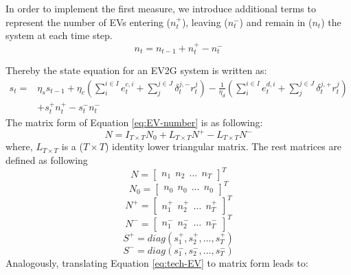 In order to implement the first measure, we introduce additional terms to represent the number of EVs entering ($n_t^+$), leaving ($n_t^-$) and remain in ($n_t$) the system at each time step. 
\begin{equation}
\label{eq:EV-number}
n_t = n_{t-1} + n_t^+ - n_t^-
\end{equation}

Thereby the state equation for an EV2G system is written as:
\begin{equation}
\label{eq:tech-EV}
\begin{aligned}
s_t = & \eta_s s_{t-1} + \eta_c (\sum_{i}^{i \in I} e_t^{c,i} + \sum_{j}^{j \in J}\delta_t^{j,-}r_t^j)- \frac{1}{\eta_d} (\sum_{i}^{i \in I} e_t^{d,i} + \sum_{j}^{j \in J}\delta_t^{j,+}r_t^j) \\
&+ s_t^+ n_t^+ - s_t^- n_t^-
\end{aligned}
\end{equation} 
\newline
The matrix form of Equation \eqref{eq:EV-number} is as following:
\begin{equation}
\label{eq:EV-number-M}
N = I_{T \times T} N_0 + L_{T \times T} N^+ -L_{T \times T} N^- 
\end{equation}
where, $L_{T \times T}$ is a ($T \times T$) identity lower triangular matrix. The rest matrices are defined as following
\begin{equation*}
N = \begin{bmatrix}
n_1~~n_2~~\dots~~n_T
\end{bmatrix}^T
\end{equation*}
\begin{equation*}
N_0 = \begin{bmatrix}
n_0~~n_0~~\dots~~n_0
\end{bmatrix}^T
\end{equation*}
\begin{equation*}
N^+ = \begin{bmatrix}
n_1^+~~n_2^+~~\dots~~n_T^+
\end{bmatrix}^T
\end{equation*}
\begin{equation*}
N^- = \begin{bmatrix}
n_1^-~~n_2^-~~\dots~~n_T^-
\end{bmatrix}^T
\end{equation*}
\begin{equation*}
S^+ = diag(s_1^+, s_2^+, \dots, s_T^+
)
\end{equation*}
\begin{equation*}
S^- = diag(s_1^-, s_2^-, \dots, s_T^-)
\end{equation*}
\newline
Analogously, translating Equation \eqref{eq:tech-EV} to matrix form leads to:

